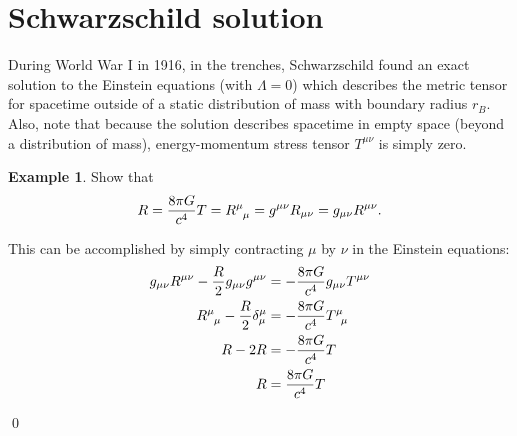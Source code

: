 \documentclass{book}
\theoremstyle{definition}
\newtheorem{exmp}{Example}[section]
\begin{document}
\section{Schwarzschild solution}
During World War I in 1916, in the trenches, Schwarzschild found an exact solution to the Einstein equations (with $\Lambda = 0$) which describes the metric tensor for spacetime outside of a static distribution of mass with boundary radius $r_B$. Also, note that because the solution describes spacetime in empty space (beyond a distribution of mass), energy-momentum stress tensor $T^{\mu\nu}$ is simply zero.\\

\begin{exmp}
	Show that
	\begin{align*}
	R = \frac{8\pi G}{c^4}T = \tensor{R}{^\mu_\mu} = g^{\mu\nu}R_{\mu\nu} = g_{\mu\nu}R^{\mu\nu}.
	\end{align*}
	
	This can be accomplished by simply contracting $\mu$ by $\nu$ in the Einstein equations:
	\begin{align*}
	g_{\mu\nu}R^{\mu\nu} - \frac{R}{2}g_{\mu\nu}g^{\mu\nu} &= -\frac{8\pi G}{c^4}g_{\mu\nu}T^{\mu\nu}\\
	\tensor{R}{^\mu_\mu} - \frac{R}{2}\delta^{\mu}_{\mu} &= -\frac{8\pi G}{c^4}\tensor{T}{^\mu_\mu}\\
	R - 2R &= -\frac{8\pi G}{c^4}T\\
	R &= \frac{8\pi G}{c^4}T
	\end{align*}
\end{exmp}\qed
\end{document}
